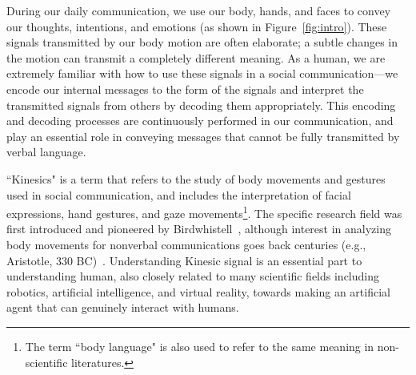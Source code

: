 During our daily communication, we use our body, hands, and faces to convey our thoughts, intentions, and emotions (as shown in Figure~\ref{fig:intro}). These signals transmitted by our body motion are often elaborate; a subtle changes in the motion can transmit a completely different meaning. As a human, we are extremely familiar with how to use these signals in a social communication---we encode our internal messages to the form of the signals and interpret the transmitted signals from others by decoding them appropriately. This encoding and decoding processes are continuously performed in our communication, and play an essential role in conveying messages that cannot be fully transmitted by verbal language.  

``Kinesics" is a term that refers to the study of body movements and gestures used in social communication, and includes the interpretation of facial expressions, hand gestures, and gaze movements\footnote{The term ``body language" is also used to refer to the same meaning in non-scientific literatures.}. The specific research field was first introduced and pioneered by Birdwhistell~\cite{Birdwhistell52,Birdwhistell-1970}, although interest in analyzing body movements for nonverbal communications goes back centuries (e.g., Aristotle, 330 BC)~\cite{dael2015measuring}. Understanding Kinesic signal is an essential part to understanding human,  also closely related to many scientific fields including robotics, artificial intelligence, and virtual reality, towards making an artificial agent that can genuinely interact with humans. 


